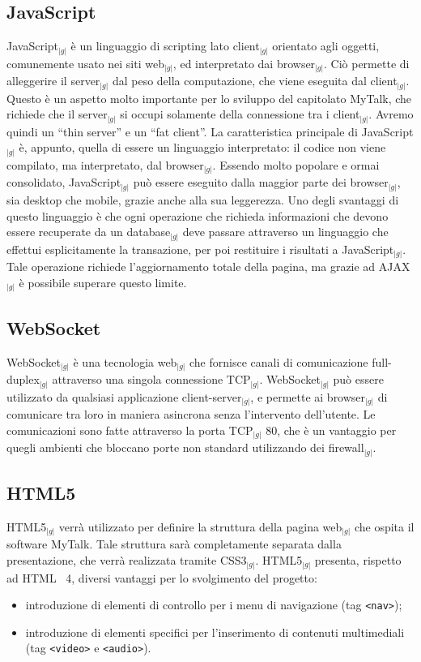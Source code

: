 {	\subsection{JavaScript}{
		JavaScript$_{|g|}$ è un linguaggio di scripting lato client$_{|g|}$ orientato agli oggetti, comunemente usato nei 
		siti web$_{|g|}$, ed interpretato dai browser$_{|g|}$. Ciò permette di alleggerire il server$_{|g|}$ dal peso della 
		computazione, che viene eseguita dal client$_{|g|}$. Questo è un aspetto molto importante per lo sviluppo del capitolato 
		MyTalk, che richiede che il server$_{|g|}$ si occupi solamente della connessione tra i client$_{|g|}$. Avremo quindi un 
		“thin server” e un “fat client”.
		La caratteristica principale di JavaScript$_{|g|}$ è, appunto, quella di essere un linguaggio interpretato: il codice 
		non viene compilato, ma interpretato, dal browser$_{|g|}$.
		Essendo molto popolare e ormai consolidato, JavaScript$_{|g|}$ può essere eseguito dalla maggior parte dei browser$_{|g|}$, 
		sia desktop che mobile, grazie anche alla sua leggerezza.
		Uno degli svantaggi di questo linguaggio è che ogni operazione che richieda informazioni che devono essere recuperate 
		da un database$_{|g|}$ deve passare attraverso un linguaggio che effettui esplicitamente la transazione, per poi 
		restituire i risultati a JavaScript$_{|g|}$. Tale operazione richiede l’aggiornamento totale della pagina, 
		ma grazie ad AJAX$_{|g|}$ è possibile superare questo limite.
	}

	\subsection{WebSocket}{
		WebSocket$_{|g|}$ è una tecnologia web$_{|g|}$ che fornisce canali di comunicazione full-duplex$_{|g|}$ attraverso una 
		singola connessione TCP$_{|g|}$. WebSocket$_{|g|}$ può essere utilizzato da qualsiasi applicazione client-server$_{|g|}$, 
		e permette ai browser$_{|g|}$ di comunicare tra loro in maniera asincrona senza l’intervento dell’utente.
		Le comunicazioni sono fatte attraverso la porta TCP$_{|g|}$ 80, che è un vantaggio per quegli ambienti che bloccano 
		porte non standard utilizzando dei firewall$_{|g|}$.
	}

	\subsection{HTML5}{
		HTML5$_{|g|}$ verrà utilizzato per definire la struttura della pagina web$_{|g|}$ che ospita il software MyTalk. 
		Tale struttura sarà completamente separata dalla presentazione, che verrà realizzata tramite CSS3$_{|g|}$. HTML5$_{|g|}$ 
		presenta, rispetto ad HTML\g~ 4, diversi vantaggi per lo svolgimento del progetto:
		\begin{itemize}
			\item introduzione di elementi di controllo per i menu di navigazione (tag \texttt{<nav>});
			\item introduzione di elementi specifici per l’inserimento di contenuti multimediali 
			      (tag \texttt{<video>} e \texttt{<audio>}).
		\end{itemize}
	}

}
